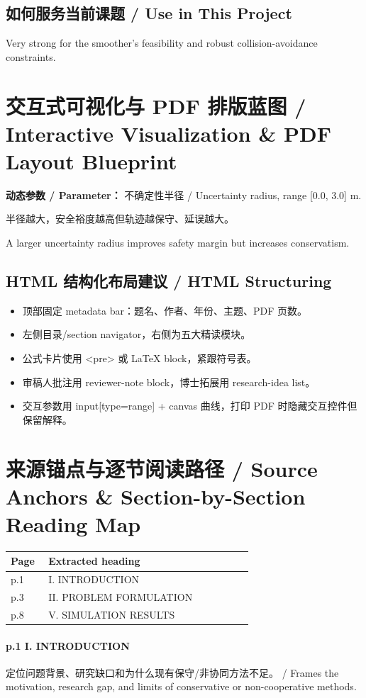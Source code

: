 \documentclass[UTF8,a4paper,11pt,fontset=fandol]{ctexart}
\begin{document}
\subsection{如何服务当前课题 / Use in This Project}
Very strong for the smoother's feasibility and robust collision-avoidance constraints.

\section{交互式可视化与 PDF 排版蓝图 / Interactive Visualization \& PDF Layout Blueprint}
\textbf{动态参数 / Parameter：} 不确定性半径 / Uncertainty radius, range [0.0, 3.0] m.

半径越大，安全裕度越高但轨迹越保守、延误越大。

A larger uncertainty radius improves safety margin but increases conservatism.

\subsection{HTML 结构化布局建议 / HTML Structuring}
\begin{itemize}
\item 顶部固定 metadata bar：题名、作者、年份、主题、PDF 页数。
\item 左侧目录/section navigator，右侧为五大精读模块。
\item 公式卡片使用 <pre> 或 LaTeX block，紧跟符号表。
\item 审稿人批注用 reviewer-note block，博士拓展用 research-idea list。
\item 交互参数用 input[type=range] + canvas 曲线，打印 PDF 时隐藏交互控件但保留解释。
\end{itemize}


\section{来源锚点与逐节阅读路径 / Source Anchors \& Section-by-Section Reading Map}
\begin{longtable}{p{0.14\linewidth}p{0.76\linewidth}}
\toprule
Page & Extracted heading\\
\midrule
p.1 & I. INTRODUCTION \\
p.3 & II. PROBLEM FORMULATION \\
p.8 & V. SIMULATION RESULTS \\
\bottomrule
\end{longtable}

\paragraph{p.1 I. INTRODUCTION}定位问题背景、研究缺口和为什么现有保守/非协同方法不足。 / Frames the motivation, research gap, and limits of conservative or non-cooperative methods.
\end{document}

